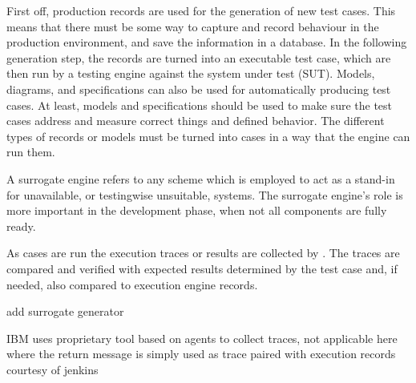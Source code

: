 \documentclass[12pt,a4paper,oneside,pdftex]{report}
\begin{document}
{First off, production records are used for the generation of new test cases. This means that there must be some way to capture and record behaviour in the production environment, and save the information in a database. In the following generation step, the records are turned into an executable test case, which are then run by a testing engine against the system under test (SUT). Models, diagrams, and specifications can also be used for automatically producing test cases. At least, models and specifications should be used to make sure the test cases address and measure correct things and defined behavior. The different types of records or models must be turned into cases in a way that the engine can run them. 

A surrogate engine refers to any scheme which is employed to act as a stand-in for unavailable, or testingwise unsuitable, systems. The surrogate engine's role is more important in the development phase, when not all components are fully ready.

As cases are run the execution traces or results are collected by . The traces are compared and verified with expected results determined by the test case and, if needed, also compared to execution engine records. 

add surrogate generator

IBM uses proprietary tool based on agents to collect traces, not applicable here where the return message is simply used as trace paired with execution records courtesy of jenkins


\begin{figure}[H]
\centering
\end{figure}}
\end{document}
